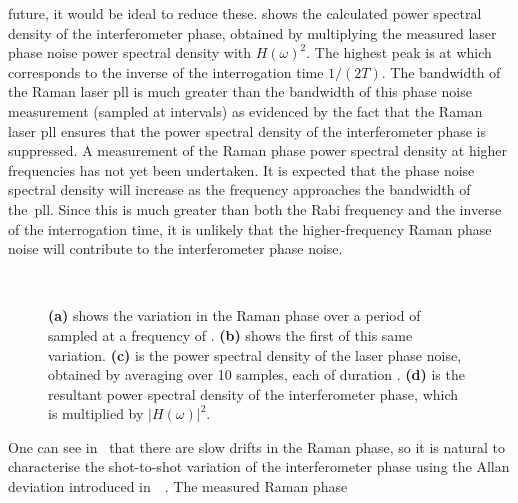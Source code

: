 future, it would be ideal to reduce these.
 shows the calculated power spectral density of the interferometer
phase, obtained by multiplying the measured laser phase noise power spectral
density with $H(\omega)^2$. The highest peak is at
 which corresponds to the inverse of the
interrogation time $1/(2T)$. The bandwidth of the Raman laser
\ac{pll} is much greater than the 
 bandwidth of this phase noise measurement (sampled
at  intervals) as evidenced by the fact that
the Raman laser \ac{pll} ensures that
the power spectral density of the interferometer phase is suppressed.
A measurement of the Raman phase power spectral density at higher frequencies has
not yet been undertaken. It is expected that the phase noise spectral
density will increase as the frequency approaches the bandwidth of
the~\ac{pll}. Since this is much greater than both the Rabi frequency
and the inverse of the interrogation time, it is unlikely that the
higher-frequency Raman phase noise will contribute to the interferometer
phase noise.
\begin{figure}[htpb!]
  \centering
{}
\\
\caption[Interferometer phase noise due to the Raman
phase]{\textbf{(a)}
  shows the variation in the Raman phase over a period of
   sampled at a frequency of .
  \textbf{(b)} shows the first  of this same variation.
  \textbf{(c)} is the power spectral density of the laser phase noise,
  obtained by averaging over 10 samples, each of duration
  .
  \textbf{(d)} is the resultant power spectral density of the
interferometer phase, which is multiplied by $|H(\omega)|^2$.}
  \label{fig:laser_phase_noise}
\end{figure}
\par\noindent
One can see in~ that there are slow
drifts in the Raman phase, 
so it is natural to characterise the shot-to-shot variation of the
interferometer phase using the
Allan deviation introduced
in~~\nocite{Gouet2008}. The measured Raman phase
